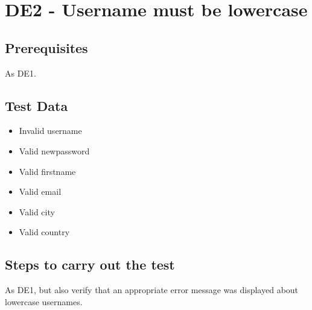 \documentclass{article}
\begin{document}
\section*{DE2 - Username must be lowercase}

\subsection*{Prerequisites}

As DE1.

\subsection*{Test Data}

\begin{itemize}
  \item Invalid username
  \item Valid newpassword
  \item Valid firstname
  \item Valid email
  \item Valid city
  \item Valid country
\end{itemize}

\subsection*{Steps to carry out the test}

As DE1, but also verify that an appropriate error message
was displayed about lowercase usernames.
\end{document}

